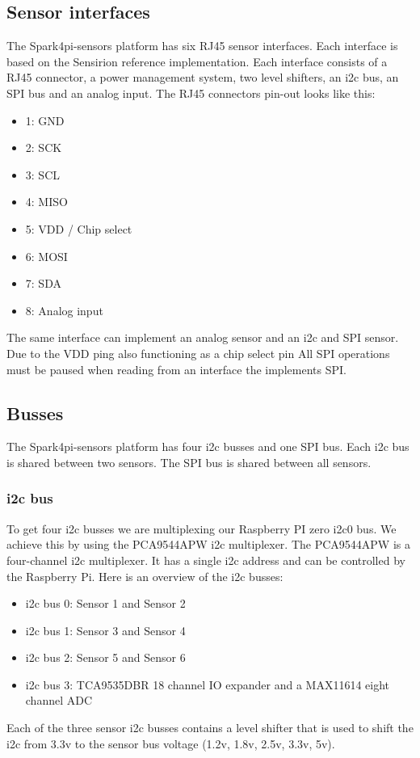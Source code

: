 \documentclass[12pt]{article}
\begin{document}
\subsection{Sensor interfaces}
The Spark4pi-sensors platform has six RJ45 sensor interfaces. Each interface is based on the Sensirion reference implementation.
Each interface consists of a RJ45 connector, a power management system, two level shifters, an i2c bus, an SPI bus and an analog input.
The RJ45 connectors pin-out looks like this:
\begin{itemize}
    \item 1: GND
    \item 2: SCK
    \item 3: SCL
    \item 4: MISO
    \item 5: VDD / Chip select
    \item 6: MOSI
    \item 7: SDA
    \item 8: Analog input
\end{itemize}
The same interface can implement an analog sensor and an i2c and SPI sensor. Due to the VDD ping also functioning as a chip select pin
All SPI operations must be paused when reading from an interface the implements SPI.
\subsection{Busses}
The Spark4pi-sensors platform has four i2c busses and one SPI bus. Each i2c bus is shared between two sensors. The SPI bus is shared between all sensors.
\subsubsection{i2c bus}
To get four i2c busses we are multiplexing our Raspberry PI zero i2c0 bus. We achieve this by using the PCA9544APW i2c multiplexer.
The PCA9544APW is a four-channel i2c multiplexer. It has a single i2c address and can be controlled by the Raspberry Pi.
Here is an overview of the i2c busses:
\begin{itemize}
    \item i2c bus 0: Sensor 1 and Sensor 2
    \item i2c bus 1: Sensor 3 and Sensor 4
    \item i2c bus 2: Sensor 5 and Sensor 6
    \item i2c bus 3: TCA9535DBR 18 channel IO expander and a MAX11614 eight channel ADC
\end{itemize}
Each of the three sensor i2c busses contains a level shifter that is used to shift the i2c from 3.3v to the sensor bus voltage (1.2v, 1.8v, 2.5v, 3.3v, 5v).
\end{document}

